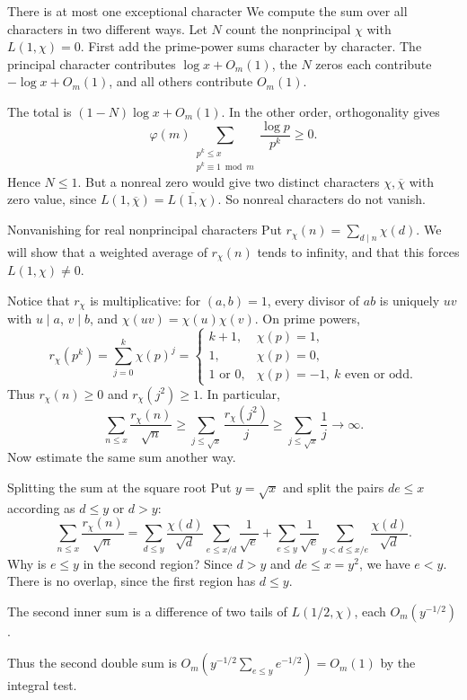 \documentclass[aspectratio=169,11pt]{beamer}
\begin{document}
\begin{frame}{There is at most one exceptional character}
We compute the sum over all characters in two different ways. Let $N$ count the nonprincipal $\chi$ with $L(1,\chi)=0$. First add the prime-power sums character by character. The principal character contributes $\log x+O_m(1)$, the $N$ zeros each contribute $-\log x+O_m(1)$, and all others contribute $O_m(1)$.

The total is $(1-N)\log x+O_m(1)$. In the other order, orthogonality gives
\[\varphi(m)\sum_{\substack{p^k\le x\\p^k\equiv1\bmod m}}\frac{\log p}{p^k}\ge0.\]
Hence $N\le1$. But a nonreal zero would give two distinct characters $\chi,\overline\chi$ with zero value, since $L(1,\overline\chi)=\overline{L(1,\chi)}$. So nonreal characters do not vanish.
\end{frame}
\begin{frame}{Nonvanishing for real nonprincipal characters}
\small
Put $r_\chi(n)=\sum_{d\mid n}\chi(d)$. We will show that a weighted average of $r_\chi(n)$ tends to infinity, and that this forces $L(1,\chi)\ne0$.

Notice that $r_\chi$ is multiplicative: for $(a,b)=1$, every divisor of $ab$ is uniquely $uv$ with $u\mid a$, $v\mid b$, and $\chi(uv)=\chi(u)\chi(v)$. On prime powers,
\[r_\chi(p^k)=\sum_{j=0}^k\chi(p)^j=
\begin{cases}k+1,&\chi(p)=1,\\1,&\chi(p)=0,\\1\text{ or }0,&\chi(p)=-1,\ k\text{ even or odd}.\end{cases}\]
Thus $r_\chi(n)\ge0$ and $r_\chi(j^2)\ge1$. In particular,
\[\sum_{n\le x}\frac{r_\chi(n)}{\sqrt n}\ge\sum_{j\le\sqrt x}\frac{r_\chi(j^2)}j\ge\sum_{j\le\sqrt x}\frac1j\longrightarrow\infty.\]
Now estimate the same sum another way.
\end{frame}
\begin{frame}{Splitting the sum at the square root}
Put $y=\sqrt x$ and split the pairs $de\le x$ according as $d\le y$ or $d>y$:
\[\sum_{n\le x}\frac{r_\chi(n)}{\sqrt n}
=\sum_{d\le y}\frac{\chi(d)}{\sqrt d}\sum_{e\le x/d}\frac1{\sqrt e}
+\sum_{e\le y}\frac1{\sqrt e}\sum_{y<d\le x/e}\frac{\chi(d)}{\sqrt d}.\]
Why is $e\le y$ in the second region? Since $d>y$ and $de\le x=y^2$, we have $e<y$. There is no overlap, since the first region has $d\le y$.

The second inner sum is a difference of two tails of $L(1/2,\chi)$, each $O_m(y^{-1/2})$.

Thus the second double sum is $O_m(y^{-1/2}\sum_{e\le y}e^{-1/2})=O_m(1)$ by the integral test.
\end{frame}
\end{document}
